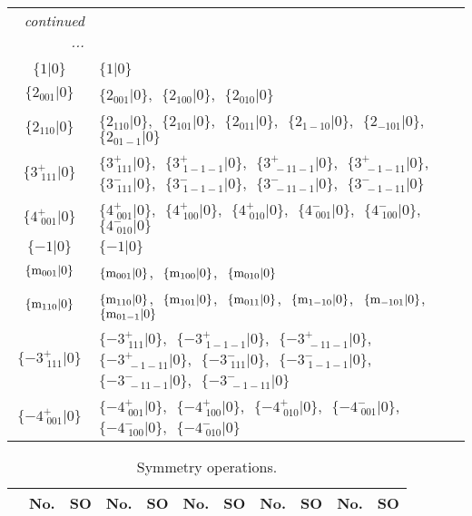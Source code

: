 \documentclass[fleqn,10pt,landscape]{article}
\begin{document}
\begin{itemize}
\begin{center}
\begin{longtable}{c|l}
 \hline \hline
\multicolumn{1}{r}{\footnotesize\it continued ...} \\ \endfoot

 \hline \hline
\multicolumn{1}{r}{} \\ \endlastfoot

$\{1|0\}$ & $\{1|0\}$ \\ \hline
$\{2{}_{001}|0\}$ & $\{2{}_{001}|0\}$,\,\, $\{2{}_{100}|0\}$,\,\, $\{2{}_{010}|0\}$ \\ \hline
$\{2{}_{110}|0\}$ & $\{2{}_{110}|0\}$,\,\, $\{2{}_{101}|0\}$,\,\, $\{2{}_{011}|0\}$,\,\, $\{2{}_{1-10}|0\}$,\,\, $\{2{}_{-101}|0\}$,\,\, $\{2{}_{01-1}|0\}$ \\ \hline
$\{3^{+}_{\,\,111}|0\}$ & $\{3^{+}_{\,\,111}|0\}$,\,\, $\{3^{+}_{\,\,1-1-1}|0\}$,\,\, $\{3^{+}_{\,\,-11-1}|0\}$,\,\, $\{3^{+}_{\,\,-1-11}|0\}$,\,\, $\{3^{-}_{\,\,111}|0\}$,\,\, $\{3^{-}_{\,\,1-1-1}|0\}$,\,\, $\{3^{-}_{\,\,-11-1}|0\}$,\,\, $\{3^{-}_{\,\,-1-11}|0\}$ \\ \hline
$\{4^{+}_{\,\,001}|0\}$ & $\{4^{+}_{\,\,001}|0\}$,\,\, $\{4^{+}_{\,\,100}|0\}$,\,\, $\{4^{+}_{\,\,010}|0\}$,\,\, $\{4^{-}_{\,\,001}|0\}$,\,\, $\{4^{-}_{\,\,100}|0\}$,\,\, $\{4^{-}_{\,\,010}|0\}$ \\ \hline
$\{-1|0\}$ & $\{-1|0\}$ \\ \hline
$\{{\rm m}_{001}|0\}$ & $\{{\rm m}_{001}|0\}$,\,\, $\{{\rm m}_{100}|0\}$,\,\, $\{{\rm m}_{010}|0\}$ \\ \hline
$\{{\rm m}_{110}|0\}$ & $\{{\rm m}_{110}|0\}$,\,\, $\{{\rm m}_{101}|0\}$,\,\, $\{{\rm m}_{011}|0\}$,\,\, $\{{\rm m}_{1-10}|0\}$,\,\, $\{{\rm m}_{-101}|0\}$,\,\, $\{{\rm m}_{01-1}|0\}$ \\ \hline
$\{-3^{+}_{\,\,111}|0\}$ & $\{-3^{+}_{\,\,111}|0\}$,\,\, $\{-3^{+}_{\,\,1-1-1}|0\}$,\,\, $\{-3^{+}_{\,\,-11-1}|0\}$,\,\, $\{-3^{+}_{\,\,-1-11}|0\}$,\,\, $\{-3^{-}_{\,\,111}|0\}$,\,\, $\{-3^{-}_{\,\,1-1-1}|0\}$,\,\, $\{-3^{-}_{\,\,-11-1}|0\}$,\,\, $\{-3^{-}_{\,\,-1-11}|0\}$ \\ \hline
$\{-4^{+}_{\,\,001}|0\}$ & $\{-4^{+}_{\,\,001}|0\}$,\,\, $\{-4^{+}_{\,\,100}|0\}$,\,\, $\{-4^{+}_{\,\,010}|0\}$,\,\, $\{-4^{-}_{\,\,001}|0\}$,\,\, $\{-4^{-}_{\,\,100}|0\}$,\,\, $\{-4^{-}_{\,\,010}|0\}$ \\
\end{longtable}
\end{center}
\begin{center}
\renewcommand{\arraystretch}{1.3}
\begin{longtable}{c|cc|cc|cc|cc|cc}
\caption{Symmetry operations.}
 \\
 \hline \hline
 & No. & SO & No. & SO & No. & SO & No. & SO & No. & SO \\ \hline \endfirsthead


\end{longtable}
\end{center}
\end{itemize}
\end{document}
